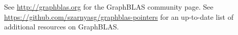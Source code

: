 \documentclass[12pt]{article}
\begin{document}
See \url{http://graphblas.org} for the GraphBLAS community page.
See
\url{https://github.com/szarnyasg/graphblas-pointers} for an up-to-date list
of additional resources on GraphBLAS.

\newpage
{\small
{}


}
\end{document}

